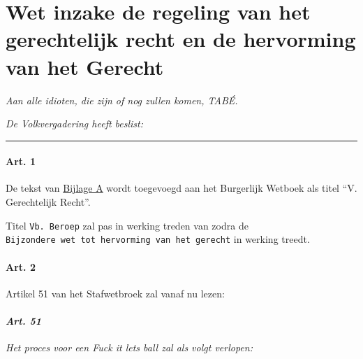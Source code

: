 \hypertarget{wet-inzake-de-regeling-van-het-gerechtelijk-recht-en-de-hervorming-van-het-gerecht}{%
\section{Wet inzake de regeling van het gerechtelijk recht en de
hervorming van het
Gerecht}\label{wet-inzake-de-regeling-van-het-gerechtelijk-recht-en-de-hervorming-van-het-gerecht}}

\emph{Aan alle idioten, die zijn of nog zullen komen, TABÉ.}

\emph{De Volkvergadering heeft beslist:}

\begin{center}\rule{0.5\linewidth}{0.5pt}\end{center}

\hypertarget{art.-1}{%
\paragraph{Art. 1}\label{art.-1}}

De tekst van \href{./Bijlage-A:-V-Gerechtelijk-Recht.md}{Bijlage A}
wordt toegevoegd aan het Burgerlijk Wetboek als titel ``V. Gerechtelijk
Recht''.

Titel \texttt{Vb.\ Beroep} zal pas in werking treden van zodra de
\texttt{Bijzondere\ wet\ tot\ hervorming\ van\ het\ gerecht} in werking
treedt.

\hypertarget{art.-2}{%
\paragraph{Art. 2}\label{art.-2}}

Artikel 51 van het Stafwetbroek zal vanaf nu lezen:

\hypertarget{art.-51}{%
\paragraph{\texorpdfstring{\emph{Art. 51}}{Art. 51}}\label{art.-51}}

\emph{Het proces voor een Fuck it lets ball zal als volgt verlopen:}

